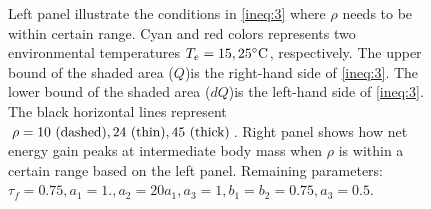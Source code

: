 \documentclass[12pt]{article}
\begin{document}
\begin{figure}
\begin{center}
	\caption{Left panel illustrate the conditions in \cref{ineq:3} where $\rho$ needs to be within certain range.
	Cyan and red colors represents two environmental temperatures $T_e = 15, 25^\circ \rm{C}$, respectively.
  The upper bound of the shaded area ($Q$)is the right-hand side of \cref{ineq:3}.
  The lower bound of the shaded area ($dQ$)is the left-hand side of \cref{ineq:3}.
  The black horizontal lines represent $\rho = 10 \textnormal{ (dashed)}, 24 \textnormal{ (thin)}, 45 \textnormal{ (thick)}$.
  Right panel shows how net energy gain peaks at intermediate body mass when $\rho$ is within a certain range based on the left panel.
  Remaining parameters: $\tau_f = 0.75, a_1 = 1., a_2 = 20 a_1, a_3 = 1, b_1 = b_2 = 0.75, a_3 = 0.5$.
	}
	\label{fig:ana}
\end{center}
\end{figure}


\end{document}
